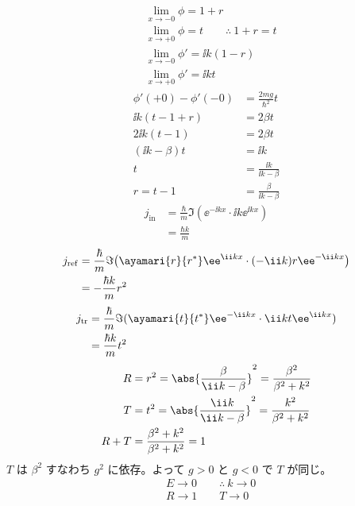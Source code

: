 \begin{align*}
&\lim_{x\to-0}\phi=1+r\\
&\lim_{x\to+0}\phi=t\qquad\therefore\ 1+r=t\\
&\lim_{x\to-0}\phi'=\ii k(1-r)\\
&\lim_{x\to+0}\phi'=\ii kt
\end{align*}
\begin{align*}
\phi'(+0)-\phi'(-0)&=\frac{2mg}{\hbar^{2}}t\\
\ii k(t-1+r)&=2\beta t\\
2\ii k(t-1)&=2\beta t\\
(\ii k-\beta)t&=\ii k\\
t&=\frac{\ii k}{\ii k-\beta}\\
r=t-1&=\frac{\beta}{\ii k-\beta}
\end{align*}
\begin{align*}
j_{\mathrm{in}}&=\frac{\hbar}{m}\Im(\ee^{-\ii kx}\cdot\ii k\ee^{\ii kx})\\
&=\frac{\hbar k}{m}
\end{align*}
\begin{align*}
j_{\mathrm{ref}}&=\frac{\hbar}{m}\Im\bigl(\ayamari{r}{r^{*}}\ee^{\ii kx}\cdot(-\ii k)r\ee^{-\ii kx}\bigr)\\
&=-\frac{\hbar k}{m}r^{2}
\end{align*}
\begin{align*}
j_{\mathrm{tr}}&=\frac{\hbar}{m}\Im(\ayamari{t}{t^{*}}\ee^{-\ii kx}\cdot\ii kt\ee^{\ii kx})\\
&=\frac{\hbar k}{m}t^{2}
\end{align*}
\begin{align*}
R&=r^{2}=\abs{\frac{\beta}{\ii k-\beta}}^{2}=\frac{\beta^{2}}{\beta^{2}+k^{2}}\\
T&=t^{2}=\abs{\frac{\ii k}{\ii k-\beta}}^{2}=\frac{k^{2}}{\beta^{2}+k^{2}}\\
R+T&=\frac{\beta^{2}+k^{2}}{\beta^{2}+k^{2}}=1
\end{align*}
$T$ は $\beta^{2}$ すなわち $g^{2}$ に依存。よって $g>0$ と $g<0$ で $T$ が同じ。
\begin{align*}
&E\to0\qquad\therefore\ k\to0\\
&R\to1\qquad T\to0
\end{align*}
